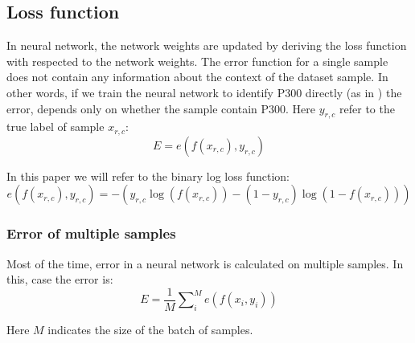 \documentclass[
12pt, %
english, %
doublespacing, %
headsepline, %
]{MastersDoctoralThesis} %
\begin{document}
\subsection{Loss function}
In neural network, the network weights are updated by deriving the loss function with respected to the network weights. The error function for a single sample does not contain any information about the context of the dataset sample. In other words, if we train the neural network to identify P300 directly (as in \cite{P300_CNN}) the error, depends only on whether the sample contain P300. Here $y_{r,c}$ refer to the true label of sample $x_{r,c}$:
\begin{equation}
E = e\left( {f\left( {{x_{r,c}}} \right),{y_{r,c}}} \right)
\end{equation} 

In this paper we will refer to the binary log loss function:
\begin{equation}\label{eq:binary_log_loss}
e\left( {f\left( {{x_{r,c}}} \right),{y_{r,c}}} \right) =  - \left( {{y_{r,c}}\log \left( {f\left( {{x_{r,c}}} \right)} \right) - \left( {1 - {y_{r,c}}} \right)\log \left( {1 - f\left( {{x_{r,c}}} \right)} \right)} \right)
\end{equation} 


\subsubsection{Error of multiple samples}
Most of the time, error in a neural network is calculated on multiple samples. In this, case the error is:
\begin{equation}\label{eq:mini_batch_loss}
E = \frac{1}{M}\sum\nolimits_i^M {e\left( {f\left( {{x_i},{y_i}} \right)} \right)}
\end{equation}

Here $M$ indicates the size of the batch of samples.
\end{document}
